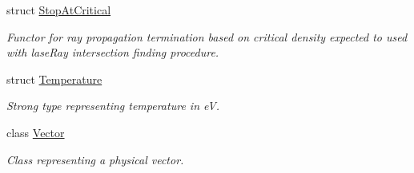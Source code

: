 \begin{DoxyCompactItemize}
struct \hyperlink{structraytracer_1_1StopAtCritical}{Stop\+At\+Critical}
\begin{DoxyCompactList}\small\item\em Functor for ray propagation termination based on critical density expected to used with lase\+Ray intersection finding procedure. \end{DoxyCompactList}\item 
struct \hyperlink{structraytracer_1_1Temperature}{Temperature}
\begin{DoxyCompactList}\small\item\em Strong type representing temperature in eV. \end{DoxyCompactList}\item 
class \hyperlink{classraytracer_1_1Vector}{Vector}
\begin{DoxyCompactList}\small\item\em Class representing a physical vector. \end{DoxyCompactList}\end{DoxyCompactItemize}
